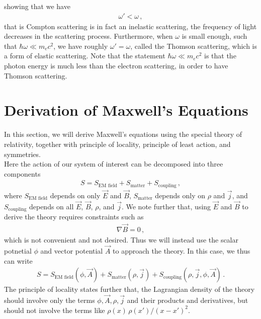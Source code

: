 \documentclass[11pt, onesided]{book}
\theoremstyle{break}
\theoremstyle{break}
\begin{document}
showing that we have
\begin{align*}
\omega' < \omega\,,
\end{align*}
that is Compton scattering is in fact an inelastic scattering, the frequency of light decreases in the scattering process. Furthermore, when $\omega$ is small enough, such that $\hbar \omega \ll m_e c^2$, we have roughly $\omega' = \omega$, called the Thomson scattering, which is a form of elastic scattering. Note that the statement $\hbar \omega \ll m_e c^2$ is that the photon energy is much less than the electron scattering, in order to have Thomson scattering. \\

\newpage
\section[Derivation of Maxwell's Equations]{\color{red} 
Derivation of Maxwell's Equations\color{black}}
In this section, we will derive Maxwell's equations using the special theory of relativity, together with principle of locality, principle of least action, and symmetries.\\

Here the action of our system of interest can be decomposed into three components
\begin{align*}
S = S_{\text{EM field}} + S_{\text{matter}} + S_{\text{coupling}}\,,
\end{align*}
where $S_{\text{EM field}}$ depends on only $\vec{E}$ and $\vec{B}$, $S_{\text{matter}}$ depends only on $\rho$ and $\vec{j}$, and $S_{\text{coupling}}$ depends on all $\vec{E}$, $\vec{B}$, $\rho$, and $\vec{j}$. We note further that, using $\vec{E}$ and $\vec{B}$ to derive the theory requires constraints such as
\begin{align*}
\nabla \vec{B} = 0\,,
\end{align*}
which is not convenient and not desired. Thus we will instead use the scalar potnetial $\phi$ and vector potential $\vec{A}$ to approach the theory. In this case, we thus can write
\begin{align*}
S = S_{\text{EM field}}(\phi, \vec{A}) + S_{\text{matter}}(\rho, \vec{j}) + S_{\text{coupling}}(\rho, \vec{j}, \phi, \vec{A})\,.
\end{align*}
The principle of locality states further that, the Lagrangian density of the theory should involve only the terms $\phi, \vec{A}, \rho, \vec{j}$ and their products and derivatives, but should not involve the terms like $\rho(x)\,\rho(x')/(x-x')^2$. \\
\end{document}
